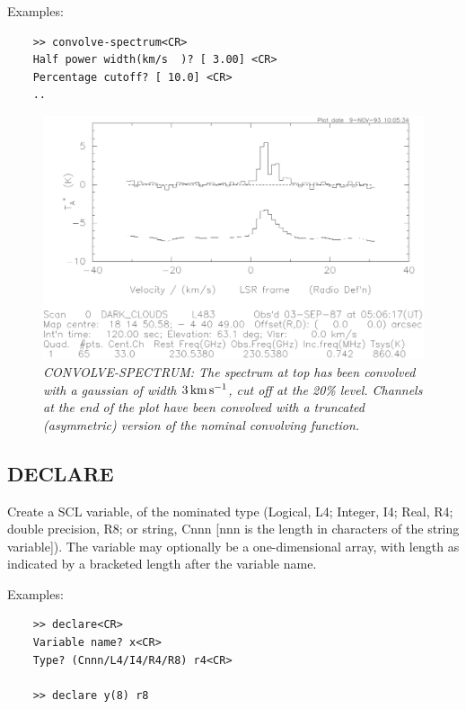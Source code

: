 \documentclass[11pt,twoside]{report}
\newcommand{\kms}{{\rm\,km\,s^{-1}}}
\begin{document}
Examples:
\begin{verbatim}
    >> convolve-spectrum<CR>
    Half power width(km/s  )? [ 3.00] <CR>
    Percentage cutoff? [ 10.0] <CR>
    ..
\end{verbatim}

\begin{figure}[htbp]
\begin{center}
\includegraphics[scale=0.65]{convolve.ps}
\protect\parbox{5.5in}
{\caption[CONVOLVE]
{\sl
CONVOLVE-SPECTRUM: The spectrum at top has been convolved with a gaussian
of width $3\kms$, cut off at the 20\% level. Channels at the end of the
plot have been convolved with a truncated (asymmetric) version of the
nominal convolving function.
\label{CONVOLVE}
}
}
\end{center}
\end{figure}

\subsection{DECLARE}  

Create a SCL variable, of the nominated type (Logical, L4; Integer, I4;
Real, R4; double precision, R8; or string, Cnnn [nnn is the length in characters
of the string variable]). The variable may
optionally be a one-dimensional array, with length as indicated by a
bracketed length after the variable name.

Examples:
\begin{verbatim}
    >> declare<CR>
    Variable name? x<CR>
    Type? (Cnnn/L4/I4/R4/R8) r4<CR>

    >> declare y(8) r8
\end{verbatim}
\end{document}
